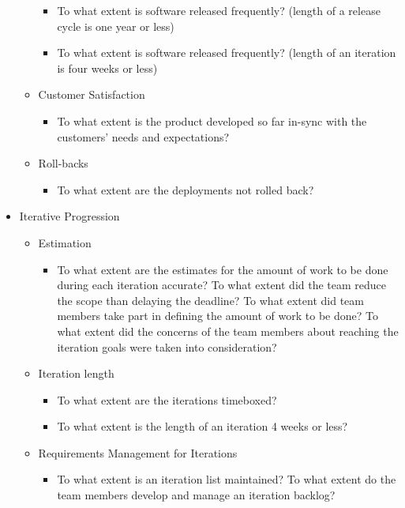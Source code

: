 \begin{appendices}
\begin{itemize}
\begin{itemize}
\begin{itemize}
					\item To what extent is software released frequently? (length of a release cycle is one year or less)
					\item To what extent is software released frequently? (length of an iteration is four weeks or less)
				\end{itemize}
			\item Customer Satisfaction
				\begin{itemize}
					\item To what extent is the product developed so far in-sync with the customers' needs and expectations?
				\end{itemize}
			\item Roll-backs
				\begin{itemize}
					\item To what extent are the deployments not rolled back?
				\end{itemize}
		\end{itemize}
	\item Iterative Progression
		\begin{itemize}
			\item Estimation
				\begin{itemize}
					\item To what extent are the estimates for the amount of work to be done during each iteration accurate?
					\addition To what extent did the team reduce the scope than delaying the deadline?
					\addition To what extent did team members take part in defining the amount of work to be done?
					\addition To what extent did the concerns of the team members about reaching the iteration goals were taken into consideration?
				\end{itemize}
			\item Iteration length
				\begin{itemize}
					\item To what extent are the iterations timeboxed?
					\item To what extent is the length of an iteration 4 weeks or less?
				\end{itemize}
			\item Requirements Management for Iterations
				\begin{itemize}
					\item To what extent is an iteration list maintained?
					\addition To what extent do the team members develop and manage an iteration backlog?

\end{itemize}
\end{itemize}
\end{itemize}
\end{appendices}
